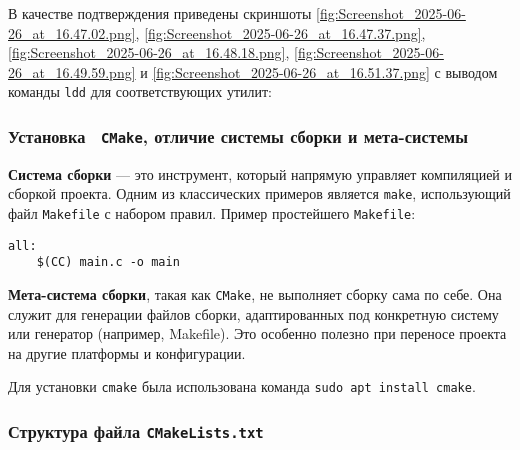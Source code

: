 В качестве подтверждения приведены скриншоты \ref{fig:Screenshot_2025-06-26_at_16.47.02.png}, \ref{fig:Screenshot_2025-06-26_at_16.47.37.png}, \ref{fig:Screenshot_2025-06-26_at_16.48.18.png}, \ref{fig:Screenshot_2025-06-26_at_16.49.59.png} и \ref{fig:Screenshot_2025-06-26_at_16.51.37.png} с выводом команды \texttt{ldd} для соответствующих утилит:






\subsubsection*{Установка  \texttt{CMake}, отличие системы сборки и мета-системы}

\textbf{Система сборки} — это инструмент, который напрямую управляет компиляцией и сборкой проекта. Одним из классических примеров является \texttt{make}, использующий файл \texttt{Makefile} с набором правил. Пример простейшего \texttt{Makefile}:

\begin{verbatim}
all:
	$(CC) main.c -o main
\end{verbatim}

\textbf{Мета-система сборки}, такая как \texttt{CMake}, не выполняет сборку сама по себе. Она служит для генерации файлов сборки, адаптированных под конкретную систему или генератор (например, Makefile). Это особенно полезно при переносе проекта на другие платформы и конфигурации.

Для установки \texttt{cmake} была использована команда \texttt{sudo apt install cmake}.


\subsubsection*{Структура файла \texttt{CMakeLists.txt}}

